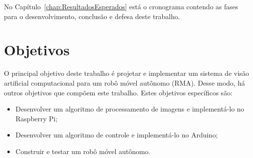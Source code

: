 No Capítulo~\ref{chap:ResultadosEsperados} está o cronograma contendo as fases para o desenvolvimento, conclusão e defesa deste trabalho.

\section{Objetivos}
\label{sec:objt}

O principal objetivo deste trabalho é projetar e implementar um sistema de visão artificial computacional para um robô móvel autônomo (RMA). Desse modo, há outros objetivos que compõem este trabalho. Estes objetivos específicos são:

\begin{itemize}
    \item Desenvolver um algoritmo de processamento de imagens e implementá-lo no Raspberry Pi;
    \item Desenvolver um algoritmo de controle e implementá-lo no Arduino;
    \item Construir e testar um robô móvel autônomo.
\end{itemize}







